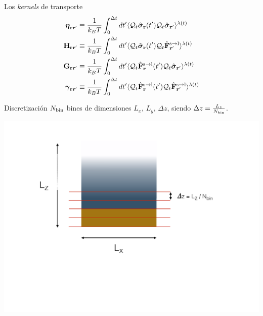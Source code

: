 \documentclass{beamer}
\begin{document}
\begin{frame}{Los \textit{kernels} de transporte}
\begin{align}
  \boldsymbol{\eta}_{{\bf  r}{\bf r}'} &\equiv
\frac{1}{k_BT}\int_0^{\Delta t} dt'\langle 
{\cal Q}_t\hat{\boldsymbol{\sigma}}_{{\bf r}}(t')
{\cal Q}_t\hat{\boldsymbol{\sigma}}_{{\bf r}'}\rangle^{\lambda(t)}
\nonumber \\
{\bf H}_{{\bf r}{\bf r}'}&\equiv\frac{1}{k_BT}\int_0^{\Delta t} dt'
\langle {\cal Q}_t\hat{\boldsymbol{\sigma}}_{{\bf r}}(t')
{\cal Q}_t\hat{\bf F}^{\rm s\to l}_{{\bf r}'}\rangle^{\lambda(t)}
\nonumber\\
{\bf G}_{{\bf r}{\bf r}'}&\equiv\frac{1}{k_BT}\int_0^{\Delta t} dt'
\langle {\cal Q}_t\hat{\bf F}^{\rm s\to l}_{{\bf r}}(t')
{\cal Q}_t\hat{\boldsymbol{\sigma}}_{{\bf r}'}\rangle^{\lambda(t)}
\nonumber\\
\boldsymbol{\gamma}_{{\bf  r}{\bf r}'}&\equiv\frac{1}{k_BT}\int_0^{\Delta t} dt'
\langle 
{\cal Q}_t\hat{\bf F}^{\rm s\to l}_{{\bf r}}(t')
{\cal Q}_t\hat{\bf F}^{\rm s\to l}_{{\bf r}'}\rangle^{\lambda(t)}
\nonumber
\end{align}
\end{frame}


\begin{frame}{Discretización}
  $N_{\rm bin}$ bines de dimensiones $L_x$, $L_y$, $\Delta z$, siendo $\Delta z = \frac{L_z}{N_{\rm bin}}$.
      \begin{center}
        \includegraphics[width=\linewidth]{discrete}
      \end{center}
  \end{frame}
\end{document}
